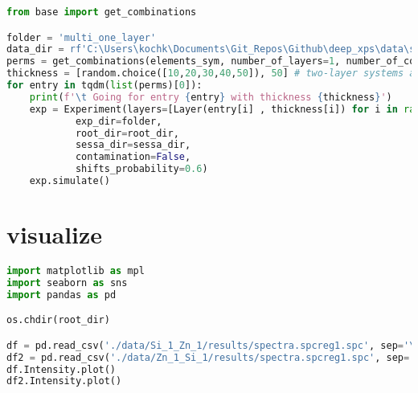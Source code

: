 \begin{lstlisting}[language=Python]
from base import get_combinations

folder = 'multi_one_layer'
data_dir = rf'C:\Users\kochk\Documents\Git_Repos\Github\deep_xps\data\simulation_data\{folder}'
perms = get_combinations(elements_sym, number_of_layers=1, number_of_combinations=30_000, lower=2, upper=4) # get one layer
thickness = [random.choice([10,20,30,40,50]), 50] # two-layer systems always have second layer of 50 Angstrom
for entry in tqdm(list(perms)[0]):
    print(f'\t Going for entry {entry} with thickness {thickness}')
    exp = Experiment(layers=[Layer(entry[i] , thickness[i]) for i in range(len(entry))],
            exp_dir=folder,
            root_dir=root_dir,
            sessa_dir=sessa_dir,
            contamination=False,
            shifts_probability=0.6)
    exp.simulate()
\end{lstlisting}

\hypertarget{visualize}{%
\section*{visualize}\label{visualize}}

\begin{lstlisting}[language=Python]
import matplotlib as mpl
import seaborn as sns
import pandas as pd

os.chdir(root_dir)

df = pd.read_csv('./data/Si_1_Zn_1/results/spectra.spcreg1.spc', sep='\s+', names=['Energy [eV]', 'Intensity'], skiprows=1)
df2 = pd.read_csv('./data/Zn_1_Si_1/results/spectra.spcreg1.spc', sep='\s+', names=['Energy [eV]', 'Intensity'], skiprows=1)
df.Intensity.plot()
df2.Intensity.plot()
\end{lstlisting}

